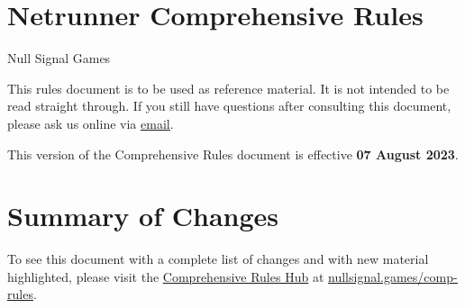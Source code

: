 \documentclass{article}
\newcommand*{\subtitle}[1]{{\Large #1 \vspace{2ex}}}
\newcommand*{\hreful}[2]{\href{#1}{\color{blue}\setulcolor{blue}\ul{#2}}}
\begin{document}

\section*{\Huge{Netrunner Comprehensive Rules}}
\subtitle{\color{darkgray}Null Signal Games}

\noindent
This rules document is to be used as reference material. It is not intended to be read straight through. If you still have questions after consulting this document, please ask us online via \hreful{mailto:rules@nullsignal.games}{email}.

\noindent
This version of the Comprehensive Rules document is effective \textbf{07 August 2023}.

\section*{Summary of Changes}

\noindent
To see this document with a complete list of changes and with new material highlighted, please visit the \hreful{https://nullsignal.games/comp-rules}{Comprehensive Rules Hub} at \textlangle{}\hreful{https://nullsignal.games/comp-rules}{nullsignal.games/comp-rules}\textrangle.

\begin{outline}[enumerate]
\end{outline}


\newpage

\section*{}

\makeatletter
\renewcommand{\l@section}{\@dottedtocline{1}{1.8em}{1.4em}}
\renewcommand{\l@subsection}{\@dottedtocline{2}{3.4em}{2.5em}}
\renewcommand{\l@subsubsection}{\@dottedtocline{3}{6em}{2.5em}}
\makeatother


\begin{multicols}{2}
  \tableofcontents
\end{multicols}


\newpage
\end{document}
